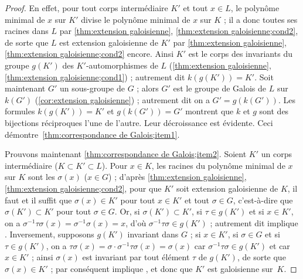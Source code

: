 \documentclass[11pt, useosf,
  title in boldface,
  theorem in new line,
  theorem numbering = section,
  number theorems separately,
]{simplivre}
\begin{document}
    \begin{proof}
        En effet, pour tout corps intermédiaire \( K' \) et tout \( x \in L \), le polynôme minimal de \( x \) sur \( K' \) divise le polynôme minimal de \( x \) sur \( K \) ; il a donc toutes ses racines dans \( L \) par \cref{thm:extension galoisienne}, \ref{thm:extension galoisienne;cond2}, de sorte que \( L \) est extension galoisienne de \( K' \) par \cref{thm:extension galoisienne}, \ref{thm:extension galoisienne;cond2} encore. Ainsi \( K' \) est le corps des invariants du groupe \( g(K') \) des \( K' \)‑automorphismes de \( L \) (\cref{thm:extension galoisienne}, \ref{thm:extension galoisienne;cond1}) ; autrement dit \( k(g(K')) = K' \). Soit maintenant \( G' \) un sous-groupe de \( G \) ; alors \( G' \) est le groupe de Galois de \( L \) sur \( k(G') \) (\cref{cor:extension galoisienne}) ; autrement dit on a \( G' = g(k(G')) \). Les formules \( k(g(K')) = K' \) et \( g(k(G')) = G' \) montrent que \( k \) et \( g \) sont des bijections réciproques l'une de l'autre. Leur décroissance est évidente. Ceci démontre~\ref{thm:correspondance de Galois;item1}.

        Prouvons maintenant \ref{thm:correspondance de Galois;item2}. Soient \( K' \) un corps intermédiaire (\( K \subset K' \subset L \)). Pour \( x \in K \), les racines du polynôme minimal de \( x \) sur \( K \) sont les \( \sigma(x) \) (\( x \in G \)) ; d'après \cref{thm:extension galoisienne}, \ref{thm:extension galoisienne;cond2}, pour que \( K' \) soit extension galoisienne de \( K \), il faut et il suffit que \( \sigma(x) \in K' \) pour tout \( x \in K' \) et tout \( \sigma \in G \), c'est-à-dire que \( \sigma(K') \subset K' \) pour tout \( \sigma \in G \). Or, si \( \sigma(K') \subset K' \), si \( \tau \in g(K') \) et si \( x \in K' \), on a \( \sigma^{-1} \tau \sigma(x) = \sigma^{-1} \sigma(x) = x \), d'où \( \sigma^{-1} \tau \sigma \in g(K') \) ; autrement dit  implique . Inversement, supposons \( g(K') \) invariant dans \( G \) ; si \( x \in K' \), si \( \sigma \in G \) et si \( \tau \in g(K') \), on a \( \tau \sigma(x) = \sigma \cdot \sigma^{-1} \tau \sigma(x) = \sigma(x) \) car \( \sigma^{-1} \tau \sigma \in g(K') \) et car \( x \in K' \) ; ainsi \( \sigma(x) \) est invariant par tout élément \( \tau \) de \( g(K') \), de sorte que \( \sigma(x) \in K' \) ; par conséquent  implique , et donc que \( K' \) est galoisienne sur~\( K \).


\end{proof}
\end{document}
